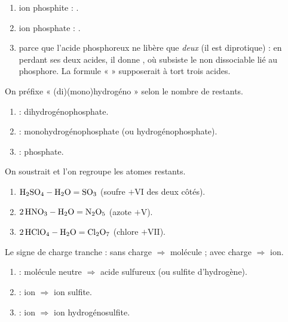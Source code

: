 \documentclass[11pt,a4paper]{article}
\begin{document}
\begin{corrige}
\begin{enumerate}[label=\alph*)]
  \item ion phosphite : .
  \item ion phosphate : .
  \item parce que l'acide phosphoreux  ne libère que \emph{deux}  (il est diprotique) : en
        perdant ses deux  acides, il donne , où subsiste le  non dissociable lié au
        phosphore. La formule «  » supposerait à tort trois  acides.
\end{enumerate}
\end{corrige}

\begin{corrige}
On préfixe « (di)(mono)hydrogéno » selon le nombre de  restants.
\begin{enumerate}[label=\alph*)]
  \item {} : dihydrogénophosphate.
  \item {} : monohydrogénophosphate (ou hydrogénophosphate).
  \item {} : phosphate.
\end{enumerate}
\end{corrige}

\begin{corrige}
On soustrait  et l'on regroupe les atomes restants.
\begin{enumerate}[label=\alph*)]
  \item $\ce{H2SO4} - \ce{H2O} = \ce{SO3}$ (soufre $+\mathrm{VI}$ des deux côtés).
  \item $\ce{2 HNO3} - \ce{H2O} = \ce{N2O5}$ (azote $+\mathrm{V}$).
  \item $\ce{2 HClO4} - \ce{H2O} = \ce{Cl2O7}$ (chlore $+\mathrm{VII}$).
\end{enumerate}
\end{corrige}

\begin{corrige}
Le signe de charge tranche : sans charge $\Rightarrow$ molécule ; avec charge $\Rightarrow$ ion.
\begin{enumerate}[label=\alph*)]
  \item {} : molécule neutre $\Rightarrow$ acide sulfureux (ou sulfite d'hydrogène).
  \item {} : ion $\Rightarrow$ ion sulfite.
  \item {} : ion $\Rightarrow$ ion hydrogénosulfite.
\end{enumerate}
\end{corrige}
\end{document}
